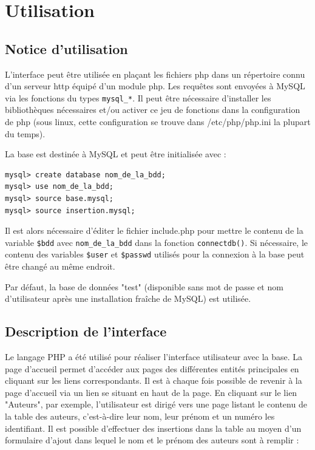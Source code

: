\documentclass[12pt]{article}
\begin{document}
\section{Utilisation}

\subsection{Notice d'utilisation}

L'interface peut être utilisée en plaçant les fichiers php dans un répertoire
connu d'un serveur http équipé d'un module php. Les requêtes sont envoyées à
MySQL via les fonctions du types \verb!mysql_*!. Il peut être nécessaire
d'installer les bibliothèques nécessaires et/ou activer ce jeu de fonctions
dans la configuration de php (sous linux, cette configuration se trouve dans
/etc/php/php.ini la plupart du temps).

La base est destinée à MySQL et peut être initialisée avec :
\begin{verbatim}
mysql> create database nom_de_la_bdd;
mysql> use nom_de_la_bdd;
mysql> source base.mysql;
mysql> source insertion.mysql;
\end{verbatim}

Il est alors nécessaire d'éditer le fichier include.php pour mettre le contenu
de la variable \verb!$bdd! avec \verb!nom_de_la_bdd! dans la fonction
\verb!connectdb()!. Si nécessaire, le contenu des variables \verb!$user! et
\verb!$passwd! utilisés pour la connexion à la base peut être changé au même
endroit.

Par défaut, la base de données "test" (disponible sans mot de passe et nom
d'utilisateur après une installation fraîche de MySQL) est utilisée.


\subsection{Description de l'interface}

Le langage PHP a été utilisé pour réaliser l'interface utilisateur avec la
base. La page d'accueil permet d'accéder aux pages des différentes entités
principales en cliquant sur les liens correspondants. Il est à chaque fois
possible de revenir à la page d'accueil via un lien se situant en haut de la
page. En cliquant sur le lien "Auteurs", par exemple, l'utilisateur est dirigé
vers une page listant le contenu de la table des auteurs, c'est-à-dire leur
nom, leur prénom et un numéro les identifiant. Il est possible d'effectuer des
insertions dans la table au moyen d'un formulaire d'ajout dans lequel le nom
et le prénom des auteurs sont à remplir :
\end{document}

